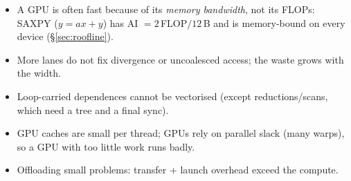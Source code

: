 \begin{trap}
\begin{itemize}
\item A GPU is often fast because of its \emph{memory bandwidth}, not its FLOPs: SAXPY ($y=ax+y$) has AI $= 2$\,FLOP$/12$\,B and is memory-bound on every device (\S\ref{sec:roofline}).
\item More lanes do not fix divergence or uncoalesced access; the waste grows with the width.
\item Loop-carried dependences cannot be vectorised (except reductions/scans, which need a tree and a final sync).
\item GPU caches are small per thread; GPUs rely on parallel slack (many warps), so a GPU with too little work runs badly.
\item Offloading small problems: transfer + launch overhead exceed the compute.
\end{itemize}
\end{trap}
